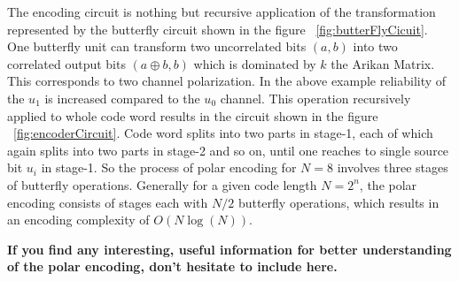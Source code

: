 The encoding circuit is nothing but recursive application of the transformation represented by the butterfly circuit shown in the figure ~\ref{fig:butterFlyCicuit}. One butterfly unit can transform two uncorrelated bits $(a,b)$ into two correlated output bits $(a\oplus b,b)$ which is dominated by $k$ the Arikan Matrix. This corresponds to two channel polarization. In the above example reliability of the $u_{1}$ is increased compared to the $u_{0}$ channel. This operation recursively applied to whole code word results in the circuit shown in the figure ~\ref{fig:encoderCircuit}. Code word splits into two parts in stage-1, each of which again splits into two parts in stage-2 and so on, until one reaches to single source bit $u_{i}$ in stage-1. So the process of polar encoding for $N = 8$ involves three stages of butterfly operations. Generally for a given code length $N=2^{n}$, the polar encoding consists of stages each with $N/2$ butterfly operations, which results in an encoding complexity of $O(N\log(N))$.


\textbf{If you find any interesting, useful information for better understanding of the polar encoding, don't hesitate to include here.} \newpage

